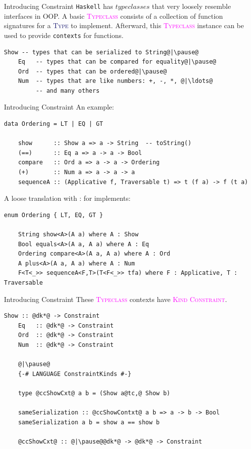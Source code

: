 \documentclass[xcolor={usenames,dvipsnames}]{beamer}
\newcommand{\htycon}[1]{\textcolor{MidnightBlue}{\textsc{#1}}}
\newcommand{\hkind}[1]{\textcolor{Fuchsia}{\textsc{#1}}}
\newcommand{\hclass}[1]{\textcolor{Magenta}{\textsc{#1}}}
\begin{document}
\begin{frame}[fragile]{Introducing Constraint}
  \texttt{Haskell} has $typeclasses$ that very loosely resemble interfaces in OOP. A basic \hclass{Typeclass} consists of a collection of function signatures for a \htycon{Type} to implement. Afterward, this \hclass{Typeclass} instance can be used to provide \texttt{contexts} for functions.
  \pause
  \begin{lstlisting}[style=hask]
    Show -- types that can be serialized to String@|\pause@
    Eq   -- types that can be compared for equality@|\pause@
    Ord  -- types that can be ordered@|\pause@
    Num  -- types that are like numbers: +, -, *, @|\ldots@
         -- and many others
  \end{lstlisting}
\end{frame}

\begin{frame}[fragile]{Introducing Constraint}
  An example:
  \begin{lstlisting}[style=hask]
    data Ordering = LT | EQ | GT

    show      :: Show a => a -> String  -- toString()
    (==)      :: Eq a => a -> a -> Bool
    compare   :: Ord a => a -> a -> Ordering
    (+)       :: Num a => a -> a -> a
    sequenceA :: (Applicative f, Traversable t) => t (f a) -> f (t a)
  \end{lstlisting}

  \pause
  A loose translation with : for implements:
  \begin{lstlisting}[style=hask]
    enum Ordering { LT, EQ, GT }

    String show<A>(A a) where A : Show
    Bool equals<A>(A a, A a) where A : Eq
    Ordering compare<A>(A a, A a) where A : Ord
    A plus<A>(A a, A a) where A : Num
    F<T<_>> sequenceA<F,T>(T<F<_>> tfa) where F : Applicative, T : Traversable
  \end{lstlisting}
\end{frame}

\begin{frame}[fragile]{Introducing Constraint}
  These \hclass{Typeclass} contexts have \hkind{Kind} \hkind{Constraint}.
  \begin{lstlisting}[style=hask]
    Show :: @dk*@ -> Constraint
    Eq   :: @dk*@ -> Constraint
    Ord  :: @dk*@ -> Constraint
    Num  :: @dk*@ -> Constraint

    @|\pause@
    {-# LANGUAGE ConstraintKinds #-}

    type @ccShowCxt@ a b = (Show a@tc,@ Show b)

    sameSerialization :: @ccShowContxt@ a b => a -> b -> Bool
    sameSerialization a b = show a == show b

    @ccShowCxt@ :: @|\pause@@dk*@ -> @dk*@ -> Constraint
  \end{lstlisting}
\end{frame}
\end{document}
